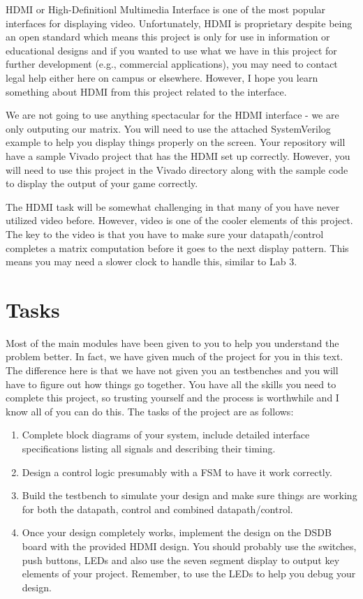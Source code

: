 \documentclass{article}
\begin{document}
HDMI or High-Definitionl Multimedia Interface is one of the most
popular interfaces for displaying video.  Unfortunately, HDMI is
proprietary despite being an open standard
which means this project is only for use in information or educational
designs and if you wanted to use what we have in this project for
further development (e.g., commercial applications), you may need to
contact legal help either here on campus or elsewhere.  However, I
hope you learn something about HDMI from this project related to the
interface.

We are not going to use anything spectacular for the HDMI interface -
we are only outputing our matrix.  You will need to use the attached
SystemVerilog example to help you display things properly on the
screen.  Your repository will have a sample Vivado project that has
the HDMI set up correctly.  However, you will need to use this project
in the Vivado directory along with the sample code to display the output of your
game correctly.  

The HDMI task will be somewhat challenging in that many of you have
never utilized video before.  However, video is one of the cooler
elements of this project.  The key to the video is that you have to
make sure your datapath/control completes a matrix computation before
it goes to the next display pattern.  This means you may need a slower
clock to handle this, similar to Lab 3.  


\section{Tasks}

Most of the main modules have been given to you to help you understand the
problem better.   In fact, we have given much of the project for you
in this text.  The difference here is that we have not given you an
testbenches and you will have to figure out how things go together.
You have all the skills you need to complete this project, so trusting
yourself and the process is worthwhile and I know all of you can do
this.  The tasks of the project are as follows:
\begin{enumerate}
  \item Complete block diagrams of your system, include detailed
    interface specifications listing all signals and describing their
    timing.  
\item Design a control logic presumably with a FSM to have it work
  correctly.
\item  Build the testbench to simulate your design and make sure
  things are working for both the datapath, control and combined
  datapath/control.    
  \item Once your design completely works, implement the design on
    the DSDB board with the provided HDMI design.
    You should probably use the switches, push
    buttons, LEDs and also use the
    seven segment display to output key elements of your project.
    Remember, to use the LEDs to help you debug your design.      
\end{enumerate}
\end{document}
